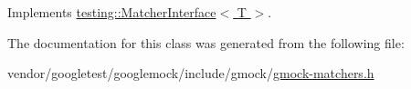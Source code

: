 Implements \hyperlink{classtesting_1_1_matcher_interface_a296b43607cd99d60365f0e6a762777cf}{testing\+::\+Matcher\+Interface$<$ T $>$}.



The documentation for this class was generated from the following file\+:\begin{DoxyCompactItemize}
\item 
vendor/googletest/googlemock/include/gmock/\hyperlink{gmock-matchers_8h}{gmock-\/matchers.\+h}\end{DoxyCompactItemize}
